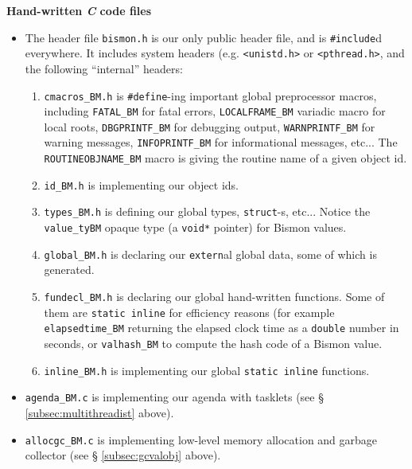 {\large \textbf{Hand-written \emph{C} code files}}

\begin{itemize}
  \item The header file \texttt{bismon.h} is our only public header file,
    and is \texttt{\#include}d everywhere. It includes system headers (e.g. \texttt{<unistd.h>} or \texttt{<pthread.h>}, and the following ``internal'' headers:
    \begin{enumerate}
      \item \texttt{cmacros\_BM.h} is \texttt{\#define}-ing important
        global preprocessor macros, including \texttt{FATAL\_BM} for
        fatal errors, \texttt{LOCALFRAME\_BM} variadic macro for local
        roots, \texttt{DBGPRINTF\_BM} for debugging output,
        \texttt{WARNPRINTF\_BM} for warning messages,
        \texttt{INFOPRINTF\_BM} for informational messages, etc... The
        \texttt{ROUTINEOBJNAME\_BM} macro is giving the routine name of
        a given object id.

      \item \texttt{id\_BM.h} is implementing our object ids.

      \item \texttt{types\_BM.h} is defining our global types,
        \texttt{struct}-s, etc... Notice the \texttt{value\_tyBM}
        opaque type (a \texttt{void*} pointer) for Bismon values.

        \item \texttt{global\_BM.h} is declaring our \texttt{extern}al
          global data, some of which is generated.
        \item \texttt{fundecl\_BM.h} is declaring our global
          hand-written functions. Some of them are \texttt{static
            inline} for efficiency reasons (for example
          \texttt{elapsedtime\_BM} returning the elapsed clock time as
          a \texttt{double} number in seconds, or \texttt{valhash\_BM}
          to compute the hash code of a Bismon value.

        \item \texttt{inline\_BM.h} is implementing our global \texttt{static
            inline} functions.
    \end{enumerate}

  \item \texttt{agenda\_BM.c} is implementing our agenda
     with tasklets  (see \S
    \ref{subsec:multithreadist} above).

  \item \texttt{allocgc\_BM.c} is implementing low-level memory
    allocation and garbage collector  (see \S
    \ref{subsec:gcvalobj} above).
  

\end{itemize}
